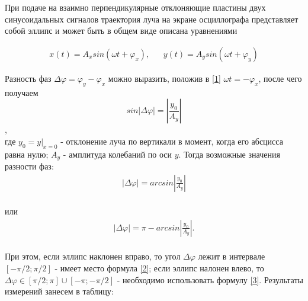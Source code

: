 \documentclass[a4paper,12pt]{article} %
\begin{document}
При подаче на взаимно перпендикулярные отклоняющие пластины двух синусоидальных сигналов траектория луча на экране осциллографа представляет собой эллипс и может быть в общем виде описана уравнениями

\begin{equation}\label{1}
\begin{aligned}
x(t) = A_x sin(\omega t + \varphi_x), && y(t) = A_y sin(\omega t + \varphi_y)
\end{aligned}
\end{equation}

Разность фаз $\Delta\varphi = \varphi_y- \varphi_x$ можно выразить, положив в \eqref{1} $\omega t = -\varphi_x$, после чего получаем
\[sin |\Delta\varphi| = \left|\frac{y_0}{A_y}\right|\],\\
где $y_0 = y|_{x=0}$ - отклонение луча по вертикали в момент, когда его абсцисса равна нулю; $A_y$ - амплитуда колебаний по оси $y$. Тогда возможные значения разности фаз:
\begin{equation}\label{2}
\begin{aligned}
|\Delta\varphi| = arcsin \left|\frac{y_0}{A_y}\right|
\end{aligned}
\end{equation}\\
или
\begin{equation}\label{3}
\begin{aligned}
|\Delta\varphi| = \pi - arcsin \left|\frac{y_0}{A_y}\right|.
\end{aligned}
\end{equation}\\
При этом, если эллипс наклонен вправо, то угол $\Delta\varphi$ лежит в интервале $[-\pi/2; \pi/2]$	- имеет место формула \eqref{2}; если эллипс налонен влево, то $\Delta\varphi \in [\pi/2; \pi]\cup[-\pi; -\pi/2]$ - необходимо использовать формулу \eqref{3}. Результаты измерений занесем в таблицу:
\end{document}
